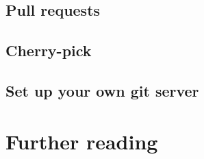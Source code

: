 \documentclass[10pt,a4paper]{beamer}
\begin{document}
\subsection{Pull requests}
\begin{frame}

\end{frame}

\subsection{Cherry-pick}
\begin{frame}

\end{frame}

\subsection{Set up your own git server}
\begin{frame}

\end{frame}

\section{Further reading}
\begin{frame}

\end{frame}
\end{document}
